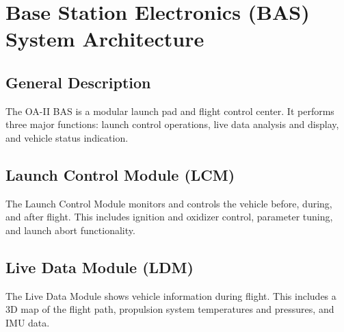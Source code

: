 \documentclass[12pt,article]{memoir}
\begin{document}

\newpage

\chapter{Base Station Electronics (BAS) System Architecture}
\section{General Description}
The OA-II BAS is a modular launch pad and flight control center. It performs three major functions: launch control operations, live data analysis and display, and vehicle status indication.
\section{Launch Control Module (LCM)}
The Launch Control Module monitors and controls the vehicle before, during, and after flight. This includes ignition and oxidizer control, parameter tuning, and launch abort functionality.
\section{Live Data Module (LDM)}
The Live Data Module shows vehicle information during flight. This includes a 3D map of the flight path, propulsion system temperatures and pressures, and IMU data.
\end{document}
